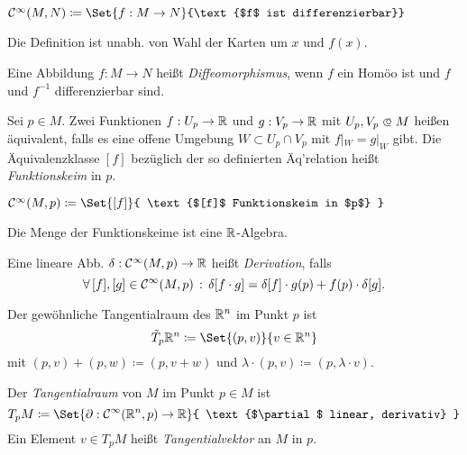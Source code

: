 \documentclass{cheat-sheet}
\newcommand{\Cont}{\mathcal{C}} %
\begin{document}
\begin{nota}
  $\Cont^\infty(M, N) \coloneqq \Set{f : M \to N}{\text{$f$ ist differenzierbar}}$
\end{nota}

\begin{bem}
  Die Definition ist unabh. von Wahl der Karten um $x$ und $f(x)$.
\end{bem}

\begin{defn}
  Eine Abbildung $f : M \to N$ heißt \emph{Diffeomorphismus}, wenn $f$ ein Homöo ist und $f$ und $f^{-1}$ differenzierbar sind.
\end{defn}


\begin{defn}
  Sei $p \in M$. Zwei Funktionen $f : U_p \to \mathbb{R}$ und $g : V_p \to \mathbb{R}$ mit $U_p, V_p \opn M$ heißen äquivalent, falls es eine offene Umgebung $W \subset U_p \cap V_p$ mit $f|_W = g|_W$ gibt. Die Äquivalenzklasse $[f]$ bezüglich der so definierten Äq'relation heißt \emph{Funktionskeim} in $p$.
\end{defn}

\begin{nota}
  $\Cont^\infty(M, p) \coloneqq \Set{ [f] }{ \text{$[f]$ Funktionskeim in $p$} }$
\end{nota}

\begin{bem}
  Die Menge der Funktionskeime ist eine $\mathbb{R}$-Algebra.
\end{bem}

\begin{defn}
  Eine lineare Abb. $\delta : \Cont^\infty(M, p) \to \R$ heißt \emph{Derivation}, falls
  \[ \fa{[f], [g] \in \Cont^\infty(M, p)} \delta[f \cdot g] = \delta[f] \cdot g(p) + f(p) \cdot \delta[g]. \]
\end{defn}

\begin{defn}
  Der gewöhnliche Tangentialraum des $\mathbb{R}^n$ im Punkt $p$ ist
  \[ \tilde{T}_p \R^n \coloneqq \Set{(p, v)}{v \in \R^n} \]
  mit $(p, v) + (p, w) \coloneqq (p, v + w)$ und $\lambda \cdot (p, v) \coloneqq (p, \lambda \cdot v)$.
\end{defn}

\begin{defn}
  Der \emph{Tangentialraum} von $M$ im Punkt $p \in M$ ist
  \[ T_p M \coloneqq \Set{ \partial : \Cont^\infty(\R^n, p) \to \R }{ \text{$\partial$ linear, derivativ} } \]
  Ein Element $v \in T_p M$ heißt \emph{Tangentialvektor} an $M$ in $p$.
\end{defn}
\end{document}
